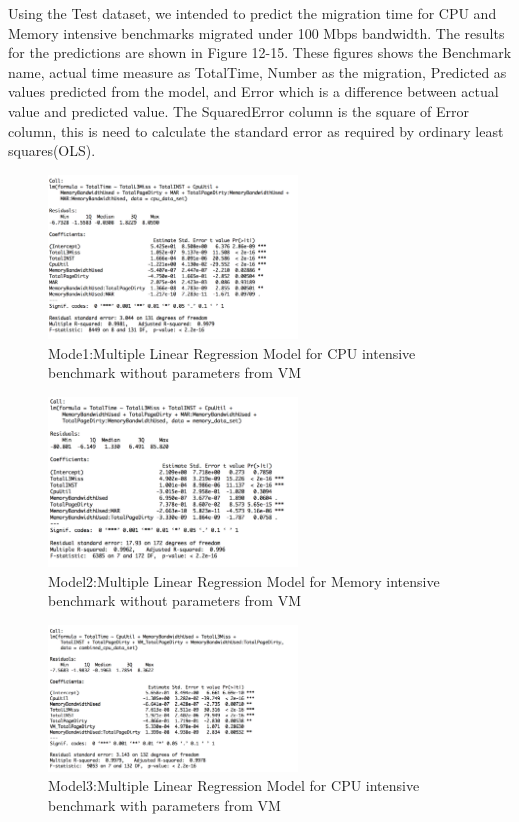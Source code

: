 \documentclass[a4paper,10pt,twoside]{article}
\begin{document}
Using the Test dataset, we intended to predict the migration time for CPU and Memory intensive benchmarks migrated under 100 Mbps bandwidth. The results for the predictions are shown in Figure 12-15. These figures shows the Benchmark name, actual time measure as TotalTime, Number as the migration, Predicted as values predicted from the model, and Error which is a difference between actual value and predicted value. The SquaredError column is the square of Error column, this is need to calculate the standard error as required by ordinary least squares(OLS).
\begin{figure}[h]
\centering
\includegraphics[width=250px]{CPU_MODEL} 
\caption{Mode1:Multiple Linear Regression Model for CPU intensive benchmark without parameters from VM}
\end{figure}
\begin{figure}[h]
\centering
\includegraphics[width=250px]{MEMORY_MODEL} 
\caption{Model2:Multiple Linear Regression Model for Memory intensive benchmark without parameters from VM}
\end{figure}
\begin{figure}[h]
\centering
\includegraphics[width=250px]{CPU_COMBINED_MODEL} 
\caption{Model3:Multiple Linear Regression Model for CPU intensive benchmark with parameters from VM}
\end{figure}
\end{document}
